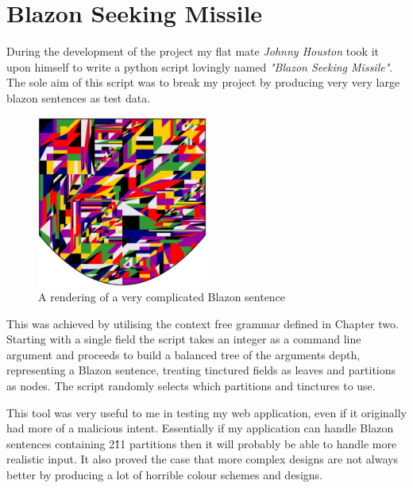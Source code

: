 \section{Blazon Seeking Missile} 

During the development of the project my flat mate \emph{Johnny Houston} took it upon himself to write a python script lovingly named \emph{"Blazon Seeking Missile"}.  The sole aim of this script was to break my project by producing very very large blazon sentences as test data.  


\begin{figure}[H]
  \centering
    \includegraphics[width=0.5\textwidth]{testing/images/bigmess.eps}
  \caption{A rendering of a very complicated Blazon sentence}
  
\end{figure}


This was achieved by utilising the context free grammar defined in Chapter two.  Starting with a single field the script takes an integer as a command line argument and proceeds to build a balanced tree of the arguments depth, representing a Blazon sentence, treating tinctured fields as leaves and partitions as nodes.   The script randomly selects which partitions and tinctures to use.  

This tool was very useful to me in testing my web application, even if it originally had more of a malicious intent.  Essentially if my application can handle Blazon sentences containing 2\^11 partitions then it will probably be able to handle more realistic input.  It also proved the case that more complex designs are not always better by producing a lot of horrible colour schemes and designs.  

